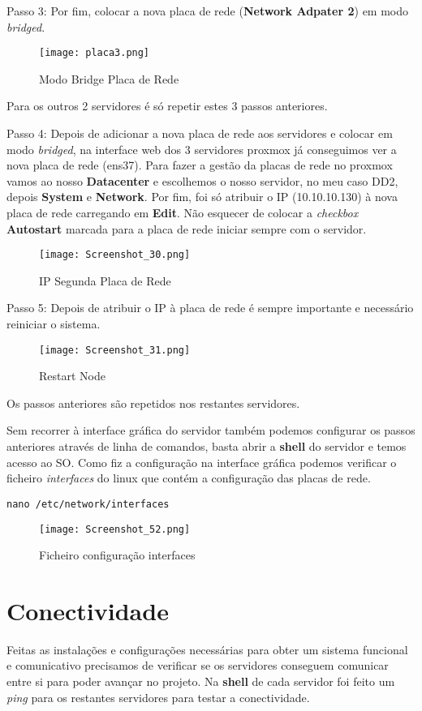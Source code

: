 \newpage
Passo 3: Por fim, colocar a nova placa de rede (\textbf{Network Adpater 2}) em modo \textit{bridged}.
\begin{figure}[H]
\center
\texttt{[image: placa3.png]}
\caption{Modo Bridge Placa de Rede}
\end{figure}

Para os outros 2 servidores é só repetir estes 3 passos anteriores.

\newpage
Passo 4: Depois de adicionar a nova placa de rede aos servidores e colocar em modo \textit{bridged}, na interface web dos 3 servidores proxmox já conseguimos ver a nova placa de rede (ens37). Para fazer a gestão da placas de rede no proxmox vamos ao nosso \textbf{Datacenter} e escolhemos o nosso servidor, no meu caso DD2, depois \textbf{System} e \textbf{Network}.
Por fim, foi só atribuir o \ac{IP} (10.10.10.130) à nova placa de rede carregando em \textbf{Edit}. Não esquecer de colocar a \textit{checkbox} \textbf{Autostart} marcada para a placa de rede iniciar sempre com o servidor.
\begin{figure}[H]
\center
\texttt{[image: Screenshot\_30.png]}
\caption{\ac{IP} Segunda Placa de Rede}
\end{figure}

Passo 5: Depois de atribuir o \ac{IP} à placa de rede é sempre importante e necessário reiniciar o sistema.
\begin{figure}[H]
\center
\texttt{[image: Screenshot\_31.png]}
\caption{Restart Node}
\end{figure}

Os passos anteriores são repetidos nos restantes servidores.

\newpage
Sem recorrer à interface gráfica do servidor também podemos configurar os passos anteriores através de linha de comandos, basta abrir a \textbf{shell} do servidor e temos acesso ao \ac{SO}. Como fiz a configuração na interface gráfica podemos verificar o ficheiro \textit{interfaces} do linux que contém a configuração das placas de rede. 
\begin{verbatim}nano /etc/network/interfaces\end{verbatim}

\begin{figure}[H]
\center
\texttt{[image: Screenshot\_52.png]}
\caption{Ficheiro configuração interfaces}
\end{figure}


\newpage
\section{Conectividade}
Feitas as instalações e configurações necessárias para obter um sistema funcional e comunicativo precisamos de verificar se os servidores conseguem comunicar entre si para poder avançar no projeto. Na \textbf{shell} de cada servidor foi feito um \textit{ping} para os restantes servidores para testar a conectividade.\\

